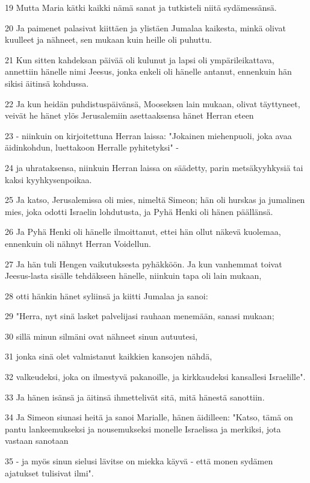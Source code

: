 \par 19 Mutta Maria kätki kaikki nämä sanat ja tutkisteli niitä sydämessänsä.
\par 20 Ja paimenet palasivat kiittäen ja ylistäen Jumalaa kaikesta, minkä olivat kuulleet ja nähneet, sen mukaan kuin heille oli puhuttu.
\par 21 Kun sitten kahdeksan päivää oli kulunut ja lapsi oli ympärileikattava, annettiin hänelle nimi Jeesus, jonka enkeli oli hänelle antanut, ennenkuin hän sikisi äitinsä kohdussa.
\par 22 Ja kun heidän puhdistuspäivänsä, Mooseksen lain mukaan, olivat täyttyneet, veivät he hänet ylös Jerusalemiin asettaaksensa hänet Herran eteen
\par 23 - niinkuin on kirjoitettuna Herran laissa: "Jokainen miehenpuoli, joka avaa äidinkohdun, luettakoon Herralle pyhitetyksi" -
\par 24 ja uhrataksensa, niinkuin Herran laissa on säädetty, parin metsäkyyhkysiä tai kaksi kyyhkysenpoikaa.
\par 25 Ja katso, Jerusalemissa oli mies, nimeltä Simeon; hän oli hurskas ja jumalinen mies, joka odotti Israelin lohdutusta, ja Pyhä Henki oli hänen päällänsä.
\par 26 Ja Pyhä Henki oli hänelle ilmoittanut, ettei hän ollut näkevä kuolemaa, ennenkuin oli nähnyt Herran Voidellun.
\par 27 Ja hän tuli Hengen vaikutuksesta pyhäkköön. Ja kun vanhemmat toivat Jeesus-lasta sisälle tehdäkseen hänelle, niinkuin tapa oli lain mukaan,
\par 28 otti hänkin hänet syliinsä ja kiitti Jumalaa ja sanoi:
\par 29 "Herra, nyt sinä lasket palvelijasi rauhaan menemään, sanasi mukaan;
\par 30 sillä minun silmäni ovat nähneet sinun autuutesi,
\par 31 jonka sinä olet valmistanut kaikkien kansojen nähdä,
\par 32 valkeudeksi, joka on ilmestyvä pakanoille, ja kirkkaudeksi kansallesi Israelille".
\par 33 Ja hänen isänsä ja äitinsä ihmettelivät sitä, mitä hänestä sanottiin.
\par 34 Ja Simeon siunasi heitä ja sanoi Marialle, hänen äidilleen: "Katso, tämä on pantu lankeemukseksi ja nousemukseksi monelle Israelissa ja merkiksi, jota vastaan sanotaan
\par 35 - ja myös sinun sielusi lävitse on miekka käyvä - että monen sydämen ajatukset tulisivat ilmi".
